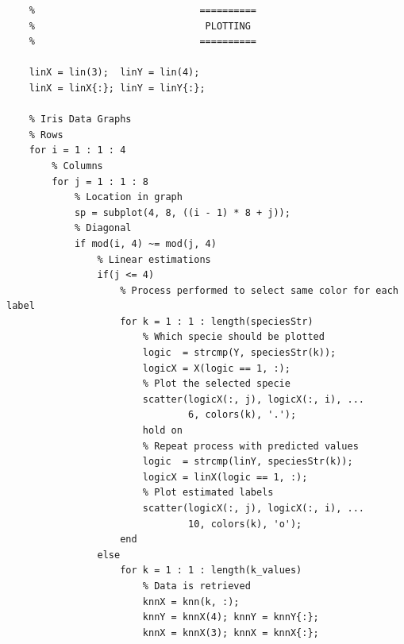 \documentclass[11pt]{article}
\begin{document}
\begin{verbatim}
    %                             ==========
    %                              PLOTTING
    %                             ==========
    
    linX = lin(3);  linY = lin(4); 
    linX = linX{:}; linY = linY{:}; 
    
    % Iris Data Graphs
    % Rows
    for i = 1 : 1 : 4
        % Columns
        for j = 1 : 1 : 8
            % Location in graph
            sp = subplot(4, 8, ((i - 1) * 8 + j));
            % Diagonal             
            if mod(i, 4) ~= mod(j, 4)
                % Linear estimations
                if(j <= 4)
                    % Process performed to select same color for each label
                    for k = 1 : 1 : length(speciesStr)
                        % Which specie should be plotted
                        logic  = strcmp(Y, speciesStr(k));
                        logicX = X(logic == 1, :);
                        % Plot the selected specie
                        scatter(logicX(:, j), logicX(:, i), ...
                                6, colors(k), '.');
                        hold on
                        % Repeat process with predicted values
                        logic  = strcmp(linY, speciesStr(k));
                        logicX = linX(logic == 1, :);
                        % Plot estimated labels
                        scatter(logicX(:, j), logicX(:, i), ...
                                10, colors(k), 'o');
                    end
                else                         
                    for k = 1 : 1 : length(k_values)
                        % Data is retrieved
                        knnX = knn(k, :); 
                        knnY = knnX(4); knnY = knnY{:};
                        knnX = knnX(3); knnX = knnX{:};
                        

\end{verbatim}
\end{document}
